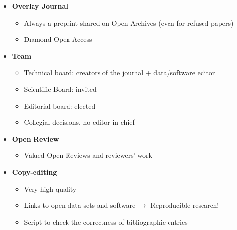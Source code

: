 \documentclass[10pt,compress,serif]{beamer}
\begin{document}
\begin{frame}[t]
 \vskip0.6cm
 \begin{itemize}
  \item \textbf{Overlay Journal}
  \begin{itemize}
  \item Always a preprint shared on Open Archives (even for refused papers)
  \item Diamond Open Access
  \end{itemize}
  \item \textbf{Team}
  \begin{itemize}
  \item Technical board: creators of the journal + data/software editor
  \item Scientific Board: invited
  \item Editorial board: elected
  \item Collegial decisions, no editor in chief
  \end{itemize}
	\item\textbf{Open Review}
	\begin{itemize}
    \item Valued Open Reviews and reviewers' work
	\end{itemize}
  \item \textbf{Copy-editing}
  \begin{itemize}
  \item Very high quality
  \item Links to open data sets and software $\to$ Reproducible research!
  \item Script to check the correctness of bibliographic entries
  \end{itemize}
 \end{itemize}

\end{frame}



\end{document}
